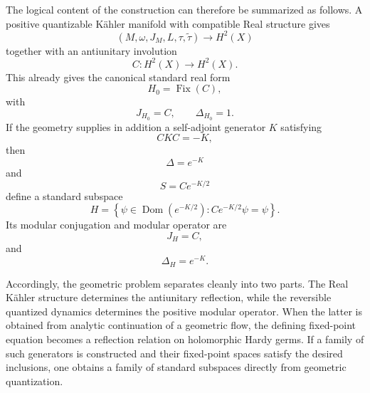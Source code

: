 \documentclass[a4paper,11pt]{article}
\theoremstyle{definition}
\newcommand{\Dom}{\operatorname{Dom}}
\begin{document}
The logical content of the construction can therefore be summarized as
follows.  A positive quantizable K\"ahler manifold with compatible Real
structure gives
\begin{equation}
    (M,\omega,J_M,L,\tau,\widetilde\tau)
    \longrightarrow
    H^2(X)
\end{equation}
together with an antiunitary involution
\begin{equation}
    C:H^2(X)\rightarrow H^2(X).
\end{equation}
This already gives the canonical standard real form
\begin{equation}
    H_0=\operatorname{Fix}(C),
\end{equation}
with
\begin{equation}
    J_{H_0}=C,
    \qquad
    \Delta_{H_0}=1.
\end{equation}
If the geometry supplies in addition a self-adjoint generator $K$ satisfying
\begin{equation}
    CKC=-K,
\end{equation}
then
\begin{equation}
    \Delta=e^{-K}
\end{equation}
and
\begin{equation}
    S=Ce^{-K/2}
\end{equation}
define a standard subspace
\begin{equation}
    H
    =
    \left\{
    \psi\in\Dom(e^{-K/2}):
    Ce^{-K/2}\psi=\psi
    \right\}.
\end{equation}
Its modular conjugation and modular operator are
\begin{equation}
    J_H=C,
\end{equation}
and
\begin{equation}
    \Delta_H=e^{-K}.
\end{equation}

Accordingly, the geometric problem separates cleanly into two parts.  The
Real K\"ahler structure determines the antiunitary reflection, while the
reversible quantized dynamics determines the positive modular operator.
When the latter is obtained from analytic continuation of a geometric flow,
the defining fixed-point equation becomes a reflection relation on
holomorphic Hardy germs.  If a family of such generators is constructed and
their fixed-point spaces satisfy the desired inclusions, one obtains a family
of standard subspaces directly from geometric quantization.
\end{document}
